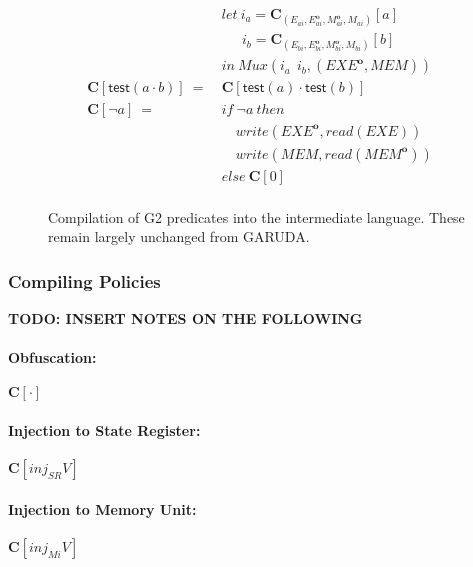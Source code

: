 \documentclass[sigconf,usenames,dvipsnames,svgnames,table]{acmart}
\newcommand{\obf}[1]{#1^\mathbf{o}}
\def \sysname {\textsc{G2}\xspace}
\def \oldname {\textsc{GARUDA}\xspace}
\begin{document}
\begin{figure}
\begin{align*}
              &let\     i_a = \mathbf{C}_{(E_{ai},\obf{E}_{ai},\obf{M}_{ai},M_{ai})}[a]\\
              &\quad\ \ i_b = \mathbf{C}_{(E_{bi},\obf{E}_{bi},\obf{M}_{bi},M_{bi})}[b]\\
              &in\ Mux(i_a\ \ i_b, (\obf{EXE},MEM))\\
            \mathbf{C}[\mathsf{test}(a \cdot b)]\ 
              =\ &\mathbf{C}[\mathsf{test}(a) \cdot \mathsf{test}(b)] \\
            \mathbf{C}[\neg a]\ 
              =\ 
              &if\ \neg a\ then\\
              &\quad write(\obf{EXE}, read(EXE))\\
              &\quad write(MEM, read(\obf{MEM}))\\
              &else\ \mathbf{C}[0]\\
          \end{align*}
          \caption{
            Compilation of \sysname predicates into the intermediate language.
            These remain largely unchanged from \oldname.
          }
          \label{fig:comp:comp:pred}
        \end{figure}

      \subsubsection{Compiling Policies}\label{sec:comp:comp:pol}

        \textbf{TODO: INSERT NOTES ON THE FOLLOWING}

        \paragraph{Obfuscation:}
          $\mathbf{C}[\cdot]$ \par

        \paragraph{Injection to State Register:}
          $\mathbf{C}[inj_{SR}V]$ \par

        \paragraph{Injection to Memory Unit:}
          $\mathbf{C}[inj_{Mi}V]$ \par
\end{document}
